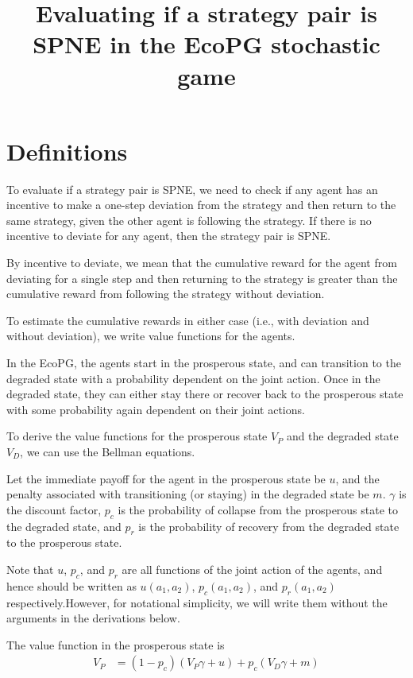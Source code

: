 \documentclass{article}
\begin{document}
\title{Evaluating if a strategy pair is SPNE in the EcoPG stochastic game}
\maketitle


\section{Definitions}

To evaluate if a strategy pair is SPNE, we need to check if any agent has an incentive to make a one-step deviation from the strategy and then return 
to the same strategy, given the other agent is following the strategy. If there is no incentive to deviate for any agent, then the strategy pair is SPNE.

By incentive to deviate, we mean that the cumulative reward for the agent from deviating for a single step and then returning to the strategy is greater 
than the cumulative reward from following the strategy without deviation.

To estimate the cumulative rewards in either case (i.e., with deviation and without deviation), 
we write value functions for the agents. 

In the EcoPG, the agents start in the prosperous state, and can transition to the degraded state with a probability dependent on the joint action. 
Once in the degraded state, they can either stay there or recover back to the prosperous state with some probability again dependent on their joint actions.

To derive the value functions for the prosperous state $V_P$ and the degraded state $V_D$, we can use the Bellman equations.

Let the immediate payoff for the agent in the prosperous state be $u$, and the penalty associated with transitioning (or staying) in the degraded state be $m$.
 $\gamma$ is the discount factor, $p_c$ is the probability of collapse from the prosperous state to the degraded state, and $p_r$ is the probability of recovery from the degraded state to the prosperous state.

Note that $u$, $p_c$, and $p_r$ are all functions of the joint action of the agents, and hence should be written as $u(a_1, a_2)$, $p_c(a_1, a_2)$, and $p_r(a_1, a_2)$
 respectively.However, for notational simplicity, we will write them without the arguments in the derivations below.

The value function in the prosperous state is
\begin{equation}
\label{eq:VP_def}
\begin{aligned}
V_{P} &= \left(1 - p_{c}\right) \left(V_{P} \gamma + u\right) +  p_{c} \left(V_{D} \gamma + m\right)
\end{aligned}
\end{equation}
\end{document}
